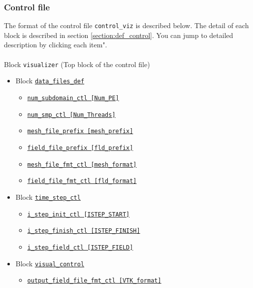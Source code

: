 \newpage
\subsubsection{Control file}
The format of the control file \verb|control_viz| is described below. The detail of each block is described in section \ref{section:def_control}. You can jump to detailed description by clicking each item". \\
\\
%
Block \verb|visualizer|  (Top block of the control file)
\label{href_i:visualizer}
%
\begin{itemize}
\item Block \hyperref[href_t:data_files_def]{\tt data\_files\_def}
	\label{href_i:data_files_def_f}
%
	\begin{itemize}
	\item \hyperref[href_t:num_subdomain_ctl]
			{\tt num\_subdomain\_ctl    [Num\_PE]}
	\item \hyperref[href_t:num_smp_ctl]
			{\tt num\_smp\_ctl    [Num\_Threads]}
	\item \hyperref[href_t:mesh_file_prefix]
			{\tt mesh\_file\_prefix    [mesh\_prefix]}
	\item \hyperref[href_t:field_file_prefix]
			{\tt field\_file\_prefix    [fld\_prefix]}
%
	\item \hyperref[href_t:mesh_file_fmt_ctl]
			{\tt mesh\_file\_fmt\_ctl    [mesh\_format]}
	\item \hyperref[href_t:field_file_fmt_ctl]
			{\tt field\_file\_fmt\_ctl    [fld\_format]}
	\end{itemize}
%
\item Block \hyperref[href_t:time_step_ctl]{\tt time\_step\_ctl}
	\begin{itemize} \label{href_i:time_step_ctl_f}
	\item \hyperref[href_t:i_step_init_ctl]
		{\tt i\_step\_init\_ctl        [ISTEP\_START]}
	\item \hyperref[href_t:i_step_finish_ctl]
		{\tt i\_step\_finish\_ctl      [ISTEP\_FINISH]}
	\item \hyperref[href_t:i_step_field_ctl]
		{\tt i\_step\_field\_ctl       [ISTEP\_FIELD]}
	\end{itemize}
%
\item Block \hyperref[href_t:visual_control]{\tt visual\_control}
    \begin{itemize} \label{href_i:visual_control_v}
    \item \hyperref[href_t:output_field_file_fmt_ctl]
		{\tt output\_field\_file\_fmt\_ctl  [VTK\_format]}
    \end{itemize}
\end{itemize}
%

